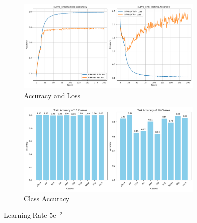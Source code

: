 \documentclass{article}
\begin{document}
\begin{appendix}
\begin{figure}[!htbp]
  \centering
  \begin{subfigure}[b]{1\textwidth}
    \includegraphics[width=\textwidth]{img/Part2/lr/curve_cnn_5e-2.png}
    \caption{Accuracy and Loss}
  \end{subfigure}
  \begin{subfigure}[b]{1\textwidth}
    \includegraphics[width=\textwidth]{img/Part2/lr/acc_cnn_class_5e-2.png}
    \caption{Class Accuracy}
  \end{subfigure}
  \caption{Learning Rate $5\mathrm{e}^{-2}$}
  \label{fig:p2_lr_5e-2}
\end{figure}


\end{appendix}
\end{document}

